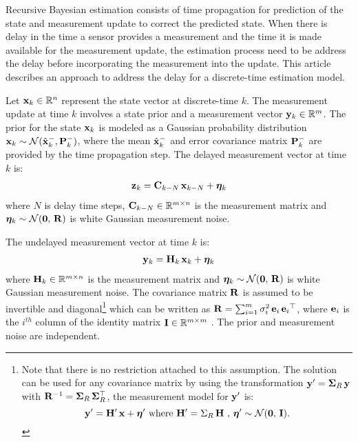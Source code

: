 

Recursive Bayesian estimation consists of time propagation for prediction of the state and measurement update to correct the predicted state.
When there is delay in the time a sensor provides a measurement and the time it is made available for the measurement update, the estimation process need to be address the delay before incorporating the measurement into the update.
This article describes an approach to address the delay for a discrete-time estimation model.

Let $\mathbf{x}_k \in\mathbb{R}^n$ represent the state vector at discrete-time $k$.
The measurement update at time $k$ involves a state prior and a measurement vector $\mathbf{y}_k\in\mathbb{R}^m$.
%
The prior for the state $\mathbf{x}_k$ is modeled as a Gaussian probability distribution $\mathbf{x}_k \sim \mathcal{N}(\hat{\mathbf{x}}_k^-,\mathbf{P}_k^-)$, where the mean $\hat{\mathbf{x}}_k^-$ and error covariance matrix $\mathbf{P}_k^-$ are provided by the time propagation step.   
The delayed measurement vector at time $k$ is:
\begin{align} \label{eqn:MeasurementModel}
	\mathbf{z}_{k} = \mathbf{C}_{k-N} \, \mathbf{x}_{k-N} + \boldsymbol{\eta}_k
\end{align}
where $N$ is delay time steps, $\mathbf{C}_{k-N}\in \mathbb{R}^{m \times n}$ is the measurement matrix and $\boldsymbol{\eta}_k \sim \mathcal{N}(\boldsymbol{0},\,\mathbf{R})$ is white Gaussian measurement noise.

The undelayed measurement vector at time $k$ is:
\begin{align} \label{eqn:MeasurementModel}
\mathbf{y}_k = \mathbf{H}_k \, \mathbf{x}_k + \boldsymbol{\eta}_k
\end{align}
where $\mathbf{H}_k \in \mathbb{R}^{m \times n}$ is the measurement matrix and $\boldsymbol{\eta}_k \sim \mathcal{N}(\boldsymbol{0},\,\mathbf{R})$ is white Gaussian measurement noise. The covariance matrix $\mathbf{R}$ is assumed to be invertible and diagonal\footnote
{\label{ftnt:R_assumption}
	Note that there is no restriction attached to this assumption. The solution can be used for any  covariance matrix by using the transformation $\mathbf{y}' =\boldsymbol{\Sigma}_R  \, \mathbf{y}$ with $\mathbf{R}^{-1} = \boldsymbol{\Sigma}_R \, \boldsymbol{\Sigma}_R^\top$, the measurement model for $\mathbf{y}'$ is:
	$$\mathbf{y}'=\mathbf{H}' \,\mathbf{x}+\boldsymbol{\eta}' \mbox{ where } \mathbf{H}' = \Sigma_R  \, \mathbf{H} \mbox{ , } \boldsymbol{\eta}' \sim \mathcal{N}(\boldsymbol{0},\,\mathbf{I}).$$
} 
which can be written as $\mathbf{R} = \sum_{i=1}^{m} \sigma_{i}^2 \, \mathbf{e}_i  \,{\mathbf{e}_i}^\top$, where $\mathbf{e}_i$ is the $i^{th}$ column of the identity matrix $\mathbf{I} \in \mathbb{R}^{m \times m}$ .
The prior and measurement noise are independent.

